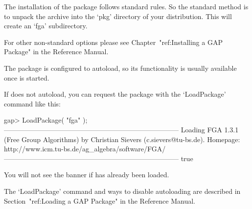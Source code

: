 

\null

The installation of the {\FGA} package follows standard {\GAP} rules.
So the standard method is to unpack the archive into the `pkg'
directory  of your {\GAP} distribution.  This will create an `fga'
subdirectory. 

For other non-standard options please see Chapter~"ref:Installing a
GAP Package" in the {\GAP} Reference Manual.


\null

The {\FGA} package is configured to autoload, so its functionality is
usually available once {\GAP} is started.

If {\GAP} does not autoload, you can request the package with the
`LoadPackage' command like this:

\testexamplefalse
\beginexample
gap> LoadPackage( "fga" );
-----------------------------------------------------------------------------
Loading  FGA 1.3.1 (Free Group Algorithms)
by Christian Sievers (c.sievers@tu-bs.de).
Homepage: http://www.icm.tu-bs.de/ag_algebra/software/FGA/
-----------------------------------------------------------------------------
true
\endexample

You will not see the banner if {\FGA} has already been loaded.

The `LoadPackage' command and ways to disable autoloading are
described in Section~"ref:Loading a GAP Package" in the {\GAP}
Reference Manual.

